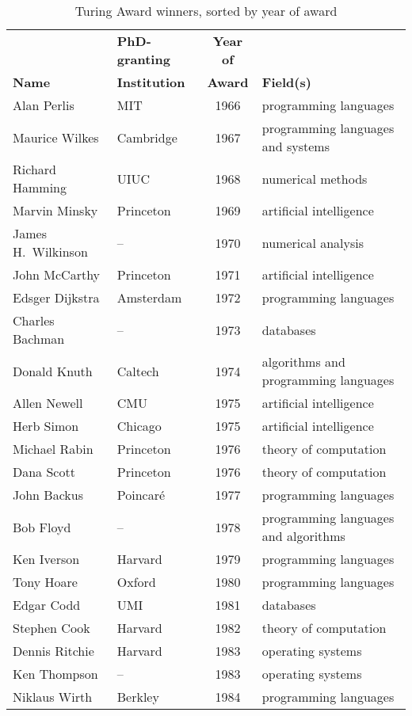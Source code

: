 \documentclass[doublespacing]{utdthesis}
\begin{document}
\begin{table}[p]
\caption{Turing Award winners, sorted by year of award}
\label{t:splittable}
\begin{center}
\begin{tabular}{llcp{2.5in}} \hline
& \textbf{PhD-granting} & \textbf{Year of} & \\
\textbf{Name} & \textbf{Institution} & \textbf{Award} & \textbf{Field(s)}
  \\ \hline
Alan Perlis & MIT & 1966 & programming languages \\
Maurice Wilkes & Cambridge & 1967 & programming languages and systems \\
Richard Hamming & UIUC & 1968 & numerical methods \\
Marvin Minsky & Princeton & 1969 & artificial intelligence \\
James H.~Wilkinson & -- & 1970 & numerical analysis \\
John McCarthy & Princeton & 1971 & artificial intelligence \\
Edsger Dijkstra & Amsterdam & 1972 & programming languages \\
Charles Bachman & -- & 1973 & databases \\
Donald Knuth & Caltech & 1974 & algorithms and programming languages \\
Allen Newell & CMU & 1975 & artificial intelligence \\
Herb Simon & Chicago & 1975 & artificial intelligence \\
Michael Rabin & Princeton & 1976 & theory of computation \\
Dana Scott & Princeton & 1976 & theory of computation \\
John Backus & Poincar\'e & 1977 & programming languages \\
Bob Floyd & -- & 1978 & programming languages and algorithms \\
Ken Iverson & Harvard & 1979 & programming languages \\
Tony Hoare & Oxford & 1980 & programming languages \\
Edgar Codd & UMI & 1981 & databases \\
Stephen Cook & Harvard & 1982 & theory of computation \\
Dennis Ritchie & Harvard & 1983 & operating systems \\
Ken Thompson & -- & 1983 & operating systems \\
Niklaus Wirth & Berkley & 1984 & programming languages \\

\end{tabular}
\end{center}
\end{table}
\end{document}
